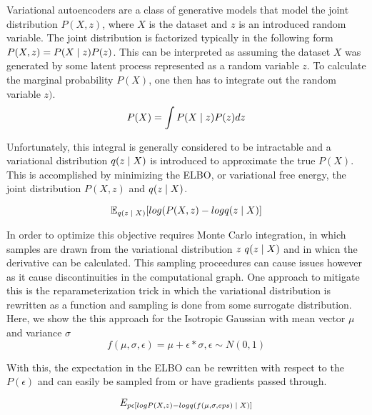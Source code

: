 Variational autoencoders are a class of generative models that model the joint distribution $P(X, z)$, where $X$ is the dataset and $z$ is an introduced random variable. The joint distribution is factorized typically in the following form $P(X, z) = P(X\; | \;{z})P(z)$. This can be interpreted as assuming the dataset $X$ was generated by some latent process represented as a random variable $z$. To calculate the marginal probability $P(X)$, one then has to integrate out the random variable $z)$.
\begin{equation}
	P(X) = \int P(X \; | \;{z}) P(z) dz
\end{equation}

Unfortunately, this integral is generally considered to be intractable and a variational distribution $q(z \; | \;{X})$ is introduced to approximate the true $P(X)$. This is accomplished by minimizing the \ac{ELBO}, or variational free energy, the joint distribution $P(X, z)$ and $q(z \; | \;{X})$. 

\begin{equation}
	\operatorname{\mathbb{E}}_{q(z \; | \;{X})} [ log(P(X, z) - log q(z \; | \;{X})] 
\end{equation}


In order to optimize this objective requires Monte Carlo integration, in which samples are drawn from the variational distribution $z ~ q(z \; | \;{X})$ and in whicn the derivative can be calculated. This sampling proceedures can cause issues however as it cause discontinuities in the computational graph. One approach to mitigate this is the reparameterization trick \cite{kingma2014autoencodingVB,rezende2014stochasticBackprop} in which the variational distribution  is rewritten as a function and sampling is done from some surrogate distribution. Here, we show the this approach for the Isotropic Gaussian with mean vector $\mu$ and variance $\sigma$
\begin{equation}
	f(\mu, \sigma, \epsilon) = \mu + \epsilon * \sigma, \epsilon \sim N(0, 1)
\end{equation}

With this, the expectation in the \ac{ELBO} can be rewritten with respect to the $P(\epsilon)$ and can easily be sampled from or have gradients passed through.

\begin{equation}
	E_{p{\epsilon} [ log P(X, z) - log q( f(\mu, \sigma, eps) \; | \;{X})]}
\end{equation}

